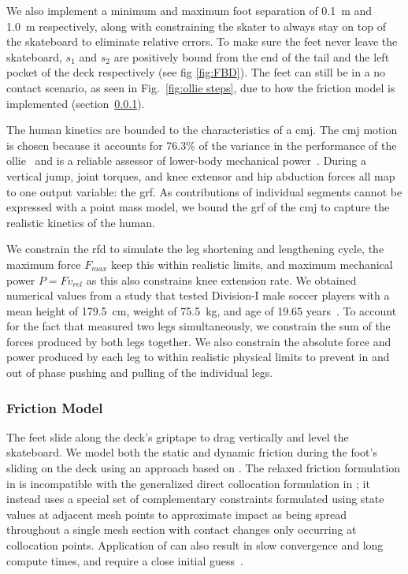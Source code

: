 \documentclass[default,iicol]{sn-jnl}
\begin{document}
We also implement a minimum and maximum foot separation of \SI{0.1}{\meter} and \SI{1.0}{\meter} respectively, along with constraining the skater to always stay on top of the skateboard to eliminate relative errors.
To make sure the feet never leave the skateboard, $s_1$ and $s_2$ are positively bound from the end of the tail and the left pocket of the deck respectively (see fig \ref{fig:FBD}).
The feet can still be in a no contact scenario, as seen in Fig.~\ref{fig:ollie steps}, due to how the friction model is implemented (section~\ref{ss_friction}).

The human kinetics are bounded to the characteristics of a \gls{cmj}.
The \gls{cmj} motion is chosen because it accounts for 76.3\% of the variance in the performance of the ollie~\cite{candotti_lower_2012} and is a reliable assessor of lower-body mechanical power~\cite{barker_relationships_2018}.
During a vertical jump, joint torques, and knee extensor and hip abduction forces all map to one output variable: the \gls{grf}.
As contributions of individual segments cannot be expressed with a point mass model, we bound the \gls{grf} of the \gls{cmj} to capture the realistic kinetics of the human.

We constrain the \gls{rfd} to simulate the leg shortening and lengthening cycle, the maximum force $F_{max}$ keep this within realistic limits, and maximum mechanical power $P = F v_{rel}$ as this also constrains knee extension rate. We obtained numerical values from a study that tested Division-I male soccer players with a mean height of \SI{179.5}{\centi\meter}, weight of \SI{75.5}{\kilo\gram}, and age of 19.65 years~\cite{barker_relationships_2018}. To account for the fact that \citet{barker_relationships_2018} measured two legs simultaneously, we constrain the sum of the forces produced by both legs together. We also constrain the absolute force and power produced by each leg to within realistic physical limits to prevent in and out of phase pushing and pulling of the individual legs.

\subsubsection{Friction Model} \label{ss_friction}
The feet slide along the deck's griptape to drag vertically and level the skateboard. We model both the static and dynamic friction during the foot's sliding on the deck using an approach based on \cite{patel_contact-implicit_2019}.
The relaxed friction formulation in \citet{patel_contact-implicit_2019} is incompatible with the generalized direct collocation formulation in \citet{betts_practical_2010}; it instead uses a special set of complementary constraints formulated using state values at adjacent mesh points to approximate impact as being spread throughout a single mesh section with contact changes only occurring at collocation points.
Application of \cite{patel_contact-implicit_2019} can also result in slow convergence and long compute times, and require a close initial guess~\cite{shield_contact-implicit_2022}.
\end{document}

